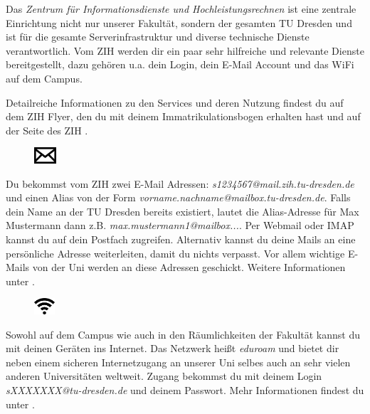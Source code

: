 
Das \textit{Zentrum für Informationsdienste und Hochleistungsrechnen} ist eine zentrale Einrichtung nicht nur unserer Fakultät, sondern der gesamten TU Dresden und ist für die gesamte Serverinfrastruktur und diverse technische Dienste verantwortlich. Vom ZIH werden dir ein paar sehr hilfreiche und relevante Dienste bereitgestellt, dazu gehören u.a. dein Login, dein E-Mail Account und das WiFi auf dem Campus.

Detailreiche Informationen zu den Services und deren Nutzung findest du auf dem ZIH Flyer, den du mit deinem Immatrikulationsbogen erhalten hast und auf der Seite des ZIH .


\begin{figure}%
  \vspace{-0.4cm}%
  \centering%
  \includegraphics[height=0.6cm]{img/icons/email.pdf}%
  \vspace{-0.4cm}%
\end{figure}

Du bekommst vom ZIH zwei E-Mail Adressen:
\textit{s1234567@mail.zih.tu-dresden.de} und einen Alias von der Form \textit{vorname.nachname@mailbox.tu-dresden.de}.
Falls dein Name an der TU Dresden bereits existiert, lautet die Alias-Adresse für Max Mustermann dann z.B. \textit{max.mustermann1@mailbox...}.
Per Webmail oder IMAP kannst du auf dein Postfach zugreifen.
Alternativ kannst du deine Mails an eine persönliche Adresse weiterleiten, damit du nichts verpasst.
Vor allem wichtige E-Mails von der Uni werden an diese Adressen geschickt. Weitere Informationen unter .


\begin{figure}%
  \vspace{-0.4cm}%
  \centering%
  \includegraphics[height=0.6cm]{img/icons/wifi.pdf}%
  \vspace{-0.4cm}%
\end{figure}

Sowohl auf dem Campus wie auch in den Räumlichkeiten der Fakultät kannst du mit deinen Geräten ins Internet.
Das Netzwerk heißt \textit{eduroam} und bietet dir neben einem sicheren Internetzugang an unserer Uni selbes auch an sehr vielen anderen Universitäten weltweit.
Zugang bekommst du mit deinem Login \textit{sXXXXXXX@tu-dresden.de} und deinem Passwort. Mehr Informationen findest du unter .

